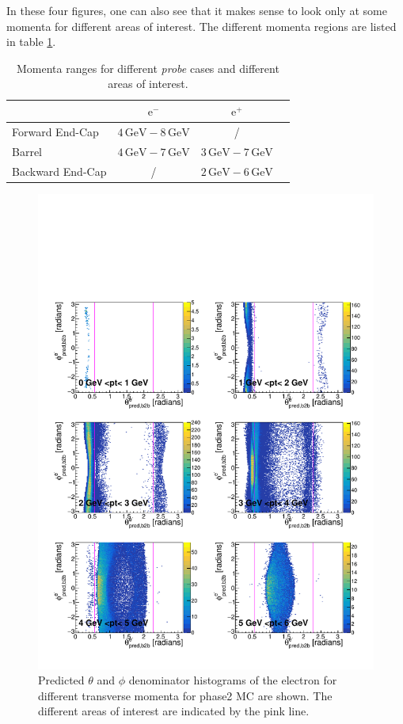 \documentclass[a4paper,11pt,twosided,final,german,openbib,pdftex,listof=totoc,bibliography=totoc]{scrbook}
\begin{document}
In these four figures, one can also see that it makes sense to look only at some momenta for different areas of interest. The different momenta regions are listed in table \ref{tab:RTPMDTable}.


\begin{table}[h!]
	\centering
	\begin{tabular}{lccc}
		&$\textrm{e}^-$ &$\textrm{e}^+$\\
		\hline
		Forward End-Cap &$4\,\textrm{GeV} - 8\,\textrm{GeV}$&/\\
		Barrel &$4\,\textrm{GeV} - 7\,\textrm{GeV}$&$3\,\textrm{GeV} - 7\,\textrm{GeV}$\\
		Backward End-Cap & /&$2\,\textrm{GeV} - 6\,\textrm{GeV}$\\	
	\end{tabular}
	
	\caption[Areas Of Interest Different Momenta Ranges]{Momenta ranges for different \textit{probe} cases and different areas of interest.}
	\label{tab:RTPMDTable}
\end{table}

\begin{figure}[h!]
	\includegraphics[width=\textwidth]{Plots/master/RTPtMemD_MC.pdf}
	\caption[Denominator $\theta$-$\phi$ Electron Transverse Momentum MC]{Predicted $\theta$ and $\phi$ denominator histograms of the electron for different transverse momenta for phase2 MC are shown. The different areas of interest are indicated by the pink line.
}
	\label{plt:RTPtMemD_MC}
\end{figure}
\end{document}
